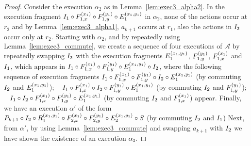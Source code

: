 \begin{proof}
Consider the execution $\alpha_2$ as in  Lemma~\ref{lem:exec3_alpha2}. 
In the execution fragment $ \fragt{I_1}{\alpha_2}{} \circ  \fragt{F_{1,x}}{\alpha_2}{x_1} \circ \fragt{F_{1,y}}{\alpha_2}{y_1} 
\circ \fragt{E_1}{\alpha_2}{x_1, y_1}$  in $\alpha_2$,  none of the actions occur at $r_2$ and  by Lemma~\ref{lem:exec3_alpha1}, $a_{k+1}$ occurs at $r_1$, 
also the actions in $\fragt{I_2}{}{}$ occur only at $r_2$.
%
Starting with $\alpha_2$, and by repeatedly using Lemma~\ref{lem:exec3_commute}, we create a sequence of four executions of $\mathcal{A}$ by repeatedly swapping 
 $\fragt{I_2}{\alpha_2}{}$ with the execution fragments 
$\fragt{E_1}{\alpha_2}{x_1, y_1}$, $\fragt{F_{1,y}}{\alpha_2}{y_1}$, $ \fragt{F_{1,x}}{\alpha_2}{x_1}$
and $\fragt{I_1}{\alpha_2}{}$, which appears in   $ \fragt{I_1}{\alpha_2}{} \circ  \fragt{F_{1,x}}{\alpha_2}{x_1} \circ \fragt{F_{1,y}}{\alpha_2}{y_1} 
\circ \fragt{E_1}{\alpha_2}{x_1, y_1}
\circ \fragt{I_2}{\alpha_2}{}$, 
where the following sequence of execution fragments
 $ \fragt{I_1}{\alpha_2}{} \circ  \fragt{F_{1,x}}{\alpha_2}{x_1} \circ \fragt{F_{1,y}}{\alpha_2}{y_1}  \circ \fragt{I_2}{\alpha_2}{} \circ \fragt{E_1}{\alpha_2}{x_1, y_1}$ (by commuting  $\fragt{I_2}{\alpha_2}{}$  and $\fragt{E_1}{\alpha_2}{x_1, y_1}$); ~
 $ \fragt{I_1}{\alpha_2}{} \circ  \fragt{F_{1,x}}{\alpha_2}{x_1} \circ \fragt{I_2}{\alpha_2}{}  \circ \fragt{F_{1,y}}{\alpha_2}{y_1} \circ \fragt{E_1}{\alpha_2}{x_1, y_1}$ (by commuting $\fragt{I_2}{\alpha_2}{}$  and $\fragt{F_{1,y}}{\alpha_2}{y_1}$); ~
 $ \fragt{I_1}{\alpha_2}{} \circ  \fragt{I_2}{\alpha_2}{}  \circ \fragt{F_{1,x}}{\alpha_2}{x_1} \circ \fragt{F_{1,y}}{\alpha_2}{y_1} \circ \fragt{E_1}{\alpha_2}{x_1, y_1}$ (by commuting   $\fragt{I_2}{\alpha_2}{}$  and $\fragt{F_{1,x}}{\alpha_2}{x_1}$)
appear. Finally, we have an  execution $\alpha'$ of the form 
$ \finiteprefixA{k}{k+1} \circ  \fragt{I_2}{\alpha''}{} \circ 
\frage{R_1}{}{x_1, y_1}
\circ \fragt{F_{2,x}}{\alpha'}{x_1} \circ \fragt{F_{2,y}}{\alpha'}{y_1} \circ \fragt{E_2}{\alpha_3'}{x_1, y_1}
\circ \fragt{S}{\alpha'}{}$ (by commuting $\fragt{I_2}{\alpha_2}{}$ and $\fragt{I_1}{\alpha_2}{}$)
Next, from $\alpha'$, by using Lemma~\ref{lem:exec3_commute}  and swapping $a_{k+1}$ with $\fragt{I_2}{\alpha_2}{}$ 
we have shown the existence  of  an execution 
 $\alpha_3$.
\end{proof}

